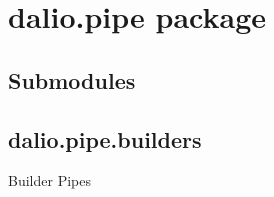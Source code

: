 \documentclass[letterpaper,10pt,english]{sphinxmanual}
\begin{document}
\chapter{dalio.pipe package}
\label{\detokenize{dalio.pipe:dalio-pipe-package}}\label{\detokenize{dalio.pipe::doc}}

\section{Submodules}
\label{\detokenize{dalio.pipe:submodules}}

\section{dalio.pipe.builders}
\label{\detokenize{dalio.pipe:module-dalio.pipe.builders}}\label{\detokenize{dalio.pipe:dalio-pipe-builders}}
Builder Pipes
\end{document}
